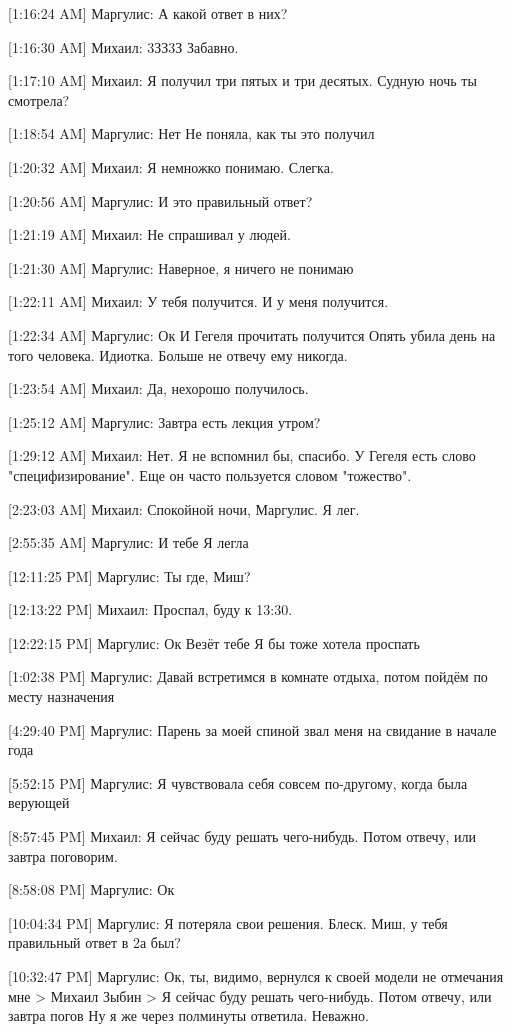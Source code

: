 \documentclass{article}
\begin{document}
[1:16:24 AM] Маргулис:
А какой ответ в них?

[1:16:30 AM] Михаил:
3ЗЗ3З
 Забавно.

[1:17:10 AM] Михаил:
Я получил три пятых и три десятых.
 Судную ночь ты смотрела?

[1:18:54 AM] Маргулис:
Нет
 Не поняла, как ты это получил

[1:20:32 AM] Михаил:
Я немножко понимаю. Слегка.

[1:20:56 AM] Маргулис:
И это правильный ответ?

[1:21:19 AM] Михаил:
Не спрашивал у людей.

[1:21:30 AM] Маргулис:
Наверное, я ничего не понимаю

[1:22:11 AM] Михаил:
У тебя получится.
 И у меня получится.

[1:22:34 AM] Маргулис:
Ок
 И Гегеля прочитать получится
 Опять убила день на того человека. Идиотка. Больше не отвечу ему никогда.

[1:23:54 AM] Михаил:
Да, нехорошо получилось.

[1:25:12 AM] Маргулис:
Завтра есть лекция утром?

[1:29:12 AM] Михаил:
Нет.
 Я не вспомнил бы, спасибо.
 У Гегеля есть слово "специфизирование". Еще он часто пользуется словом "тожество".

[2:23:03 AM] Михаил:
Спокойной ночи, Маргулис.
 Я лег.

[2:55:35 AM] Маргулис:
И тебе
 Я легла

[12:11:25 PM] Маргулис:
Ты где, Миш?

[12:13:22 PM] Михаил:
Проспал, буду к 13:30.

[12:22:15 PM] Маргулис:
Ок
 Везёт тебе
 Я бы тоже хотела проспать

[1:02:38 PM] Маргулис:
Давай встретимся в комнате отдыха, потом пойдём по месту назначения

[4:29:40 PM] Маргулис:
Парень за моей спиной звал меня на свидание в начале года

[5:52:15 PM] Маргулис:
Я чувствовала себя совсем по-другому, когда была верующей

[8:57:45 PM] Михаил:
Я сейчас буду решать чего-нибудь. Потом отвечу, или завтра поговорим.

[8:58:08 PM] Маргулис:
Ок

[10:04:34 PM] Маргулис:
Я потеряла свои решения.
 Блеск.
 Миш, у тебя правильный ответ в 2а был?

[10:32:47 PM] Маргулис:
Ок, ты, видимо, вернулся к своей модели не отмечания мне
> Михаил Зыбин
> Я сейчас буду решать чего-нибудь. Потом отвечу, или завтра погов
Ну я же через полминуты ответила. Неважно.
\end{document}
